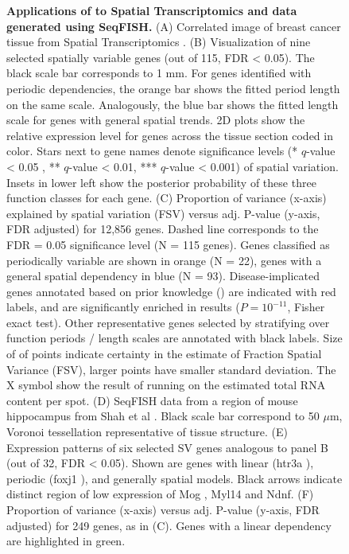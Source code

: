 \begin{figure} [t!]
    \caption[Applications of  to Spatial Transcriptomics and data generated using SeqFISH]{\textbf{Applications of  to Spatial Transcriptomics and data generated using SeqFISH.} (A) Correlated image of breast cancer tissue from Spatial Transcriptomics \cite{Stahl2016-ym}. (B) Visualization of nine selected spatially variable genes (out of 115, FDR < 0.05). The black scale bar corresponds to 1 mm. For genes identified with periodic dependencies, the orange bar shows the fitted period length on the same scale. Analogously, the blue bar shows the fitted length scale for genes with general spatial trends. 2D plots show the relative expression level for genes across the tissue section coded in color. Stars next to gene names denote significance levels (* \( q \)-value < 0.05 , ** \( q \)-value < 0.01, *** \( q \)-value < 0.001) of spatial variation. Insets in lower left show the posterior probability of these three function classes for each gene. (C) Proportion of variance (x-axis) explained by spatial variation (FSV) versus adj. P-value (y-axis, FDR adjusted) for 12,856 genes. Dashed line corresponds to the FDR = 0.05 significance level (N = 115 genes). Genes classified as periodically variable are shown in orange (N = 22), genes with a general spatial dependency in blue (N = 93). Disease-implicated genes annotated based on prior knowledge (\cite{Stahl2016-ym}) are indicated with red labels, and are significantly enriched in  results (\( P = 10^{-11} \), Fisher exact test). Other representative genes selected by stratifying over function periods / length scales are annotated with black labels. Size of of points indicate certainty in the estimate of Fraction Spatial Variance (FSV), larger points have smaller standard deviation. The X symbol show the result of running  on the estimated total RNA content per spot. (D) SeqFISH data from a region of mouse hippocampus from Shah et al \cite{Shah2016-bi}. Black scale bar correspond to 50 \( \mu \)m, Voronoi tessellation representative of tissue structure. (E) Expression patterns of six selected SV genes analogous to panel B (out of 32, FDR < 0.05). Shown are genes with linear (htr3a ), periodic (foxj1 ), and generally spatial models. Black arrows indicate distinct region of low expression of  Mog ,  Myl14  and  Ndnf. (F) Proportion of variance (x-axis) versus adj. P-value (y-axis, FDR adjusted) for 249 genes, as in (C). Genes with a linear dependency are highlighted in green.}
\end{figure}


